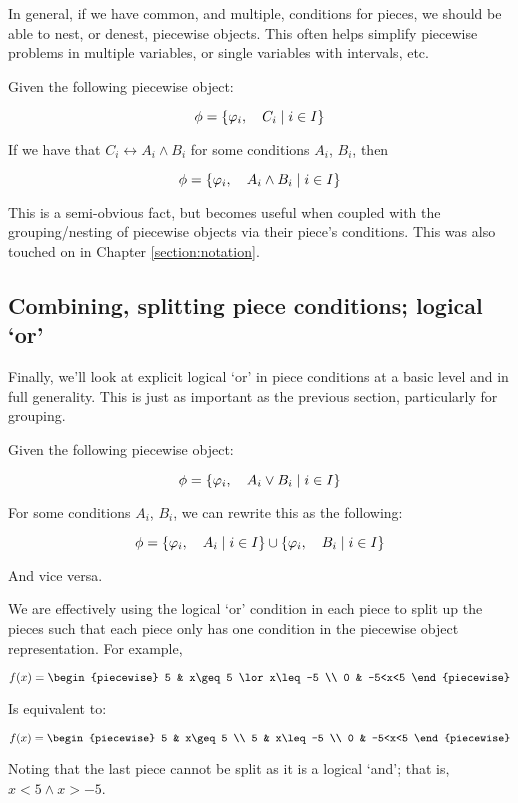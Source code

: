 In general, if we have common, and multiple, conditions for pieces, we should be able to nest, or denest, piecewise objects. This often helps simplify piecewise problems in multiple variables, or single variables with intervals, etc.

\begin{theorem}
    Given the following piecewise object:
    
    $$
        \phi=\{\varphi_i,\quad C_i\mid i\in I\}
    $$
    
    If we have that $C_i\leftrightarrow A_i\land B_i$ for some conditions $A_i$, $B_i$, then

    $$
        \phi=\{\varphi_i,\quad A_i\land B_i\mid i\in I\}
    $$

    This is a semi-obvious fact, but becomes useful when coupled with the grouping/nesting of piecewise objects via their piece's conditions. This was also touched on in Chapter \ref{section:notation}.
\end{theorem}
\subsection{Combining, splitting piece conditions; logical `or'}
Finally, we'll look at explicit logical `or' in piece conditions at a basic level and in full generality. This is just as important as the previous section, particularly for grouping.

\begin{theorem}
    Given the following piecewise object:

    $$
        \phi=\{\varphi_i,\quad A_i\lor B_i\mid i\in I\}
    $$

    For some conditions $A_i$, $B_i$, we can rewrite this as the following:

    $$
        \phi=\{\varphi_i,\quad A_i\mid i\in I\}\cup\{\varphi_i,\quad B_i\mid i\in I\}
    $$

    And vice versa.

    We are effectively using the logical `or' condition in each piece to split up the pieces such that each piece only has one condition in the piecewise object representation. For example,

    $$
        f(x) = \begin{piecewise}
            5 & x\geq 5 \lor x\leq -5 \\
            0 & -5<x<5
        \end{piecewise}
    $$

    Is equivalent to:

    $$
        f(x) = \begin{piecewise}
            5 & x\geq 5 \\
            5 & x\leq -5 \\
            0 & -5<x<5
        \end{piecewise}
    $$

    Noting that the last piece cannot be split as it is a logical `and'; that is, $x<5\land x>-5$.
\end{theorem}

